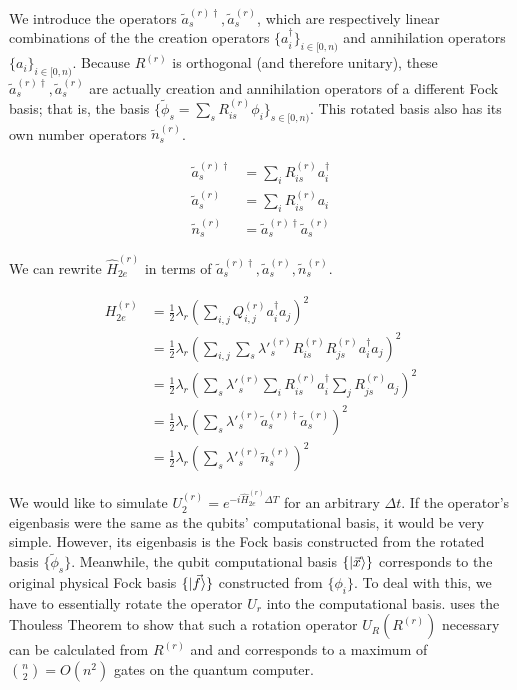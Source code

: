 We introduce the operators $\tilde{a}^{(r)\dag}_s, \tilde{a}^{(r)}_s$, which are respectively linear combinations of the the creation operators $\{a^\dag_i\}_{i \in [0, n)}$ and annihilation operators $\{a_i\}_{i \in [0, n)}$. Because $R^{(r)}$ is orthogonal (and therefore unitary), these $\tilde{a}^{(r)\dag}_s, \tilde{a}^{(r)}_s$ are actually creation and annihilation operators of a different Fock basis; that is, the basis $\{\tilde{\phi}_s = \sum_s R^{(r)}_{is} \phi_i\}_{s \in [0, n)}$. This rotated basis also has its own number operators $\tilde{n}^{(r)}_s$.

\begin{equation}
    \begin{split}
        \tilde{a}^{(r)\dag}_s &= \sum_iR^{(r)}_{is}a^\dag_i \\
        \tilde{a}^{(r)}_s &= \sum_iR^{(r)}_{is}a_i \\
        \tilde{n}^{(r)}_s &= \tilde{a}^{(r)\dag}_s\tilde{a}^{(r)}_s
    \end{split}
\end{equation}

We can rewrite $\hat{H}_{2e}^{(r)}$ in terms of $\tilde{a}^{(r)\dag}_s, \tilde{a}^{(r)}_s, \tilde{n}^{(r)}_s$.

\begin{equation}
    \begin{split}
        H_{2e}^{(r)} &= \frac{1}{2}\lambda_r\left(\sum_{i,j} Q^{(r)}_{i, j}a^\dag_ia_j\right)^2 \\
        &= \frac{1}{2}\lambda_r\left(\sum_{i,j} \sum_s \lambda'^{(r)}_s R^{(r)}_{is}R^{(r)}_{js}a^\dag_ia_j\right)^2 \\
        &= \frac{1}{2}\lambda_r\left(\sum_s \lambda'^{(r)}_s \sum_i R^{(r)}_{is}a^\dag_i\sum_jR^{(r)}_{js}a_j\right)^2 \\
        &= \frac{1}{2}\lambda_r\left(\sum_s \lambda'^{(r)}_s \tilde{a}^{(r)\dag}_s\tilde{a}^{(r)}_s\right)^2 \\
        &= \frac{1}{2}\lambda_r\left(\sum_s \lambda'^{(r)}_s \tilde{n}^{(r)}_s\right)^2
    \end{split}
\end{equation}

We would like to simulate $U_2^{(r)} = e^{-i\hat{H}_{2e}^{(r)}\Delta T}$ for an arbitrary $\Delta t$. If the operator's eigenbasis were the same as the qubits' computational basis, it would be very simple. However, its eigenbasis is the Fock basis constructed from the rotated basis $\{\tilde{\phi}_s\}$. Meanwhile, the qubit computational basis $\{\ket{\vec{x}}\}$ corresponds to the original physical Fock basis $\{\ket{\vec{f}}\}$ constructed from $\{\phi_i\}$. To deal with this, we have to essentially rotate the operator $U_r$ into the computational basis. \cite{FSN} uses the Thouless Theorem to show that such a rotation operator $U_R(R^{(r)})$ necessary can be calculated from $R^{(r)}$ and and corresponds to a maximum of ${n \choose 2} = O(n^2)$ gates on the quantum computer. 

